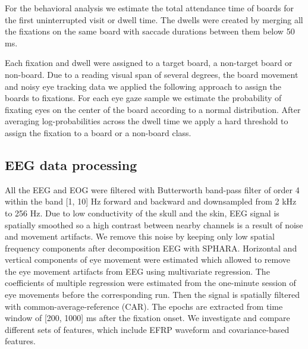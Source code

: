 \documentclass[12pt]{iopart}
\begin{document}
For the behavioral analysis we estimate the total attendance time of boards
for the first uninterrupted visit or dwell time. The dwells were created
by merging all the fixations on the same board with saccade durations
between them below 50 ms.

Each fixation and dwell were assigned to a target board, a non-target board or non-board.
Due to a reading visual span of several degrees, the board movement and 
noisy eye tracking data we applied the following approach to assign the boards
to fixations. For each eye gaze sample we estimate the probability of
fixating eyes on the center of the board according to a normal distribution.
After averaging log-probabilities across the dwell time we apply a hard
threshold to assign the fixation to a board or a non-board class.


\subsection{EEG data processing}
All the EEG and EOG were filtered with Butterworth band-pass filter
of order 4 within the band [1, 10] Hz
forward and backward and downsampled from 2 kHz to 256 Hz.
Due to low conductivity of the skull and the skin,
EEG signal is spatially smoothed so a high contrast between nearby channels
is a result of noise and movement artifacts. We remove this noise
by keeping only low spatial frequency components after decomposition EEG with SPHARA.
Horizontal and vertical components of eye movement were estimated which allowed
to remove the eye movement artifacts from EEG using multivariate regression.
The coefficients of multiple regression were estimated from the 
one-minute session of eye movements before the corresponding run.
Then the signal is spatially
filtered with common-average-reference (CAR). The epochs are extracted
from time window of [200, 1000] ms after the fixation onset.
We investigate and compare different sets
of features, which include EFRP waveform and covariance-based features.
\end{document}
